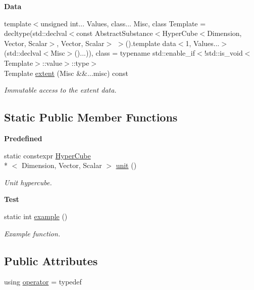 \begin{Indent}{\bf Data}
\begin{DoxyCompactItemize}
{\footnotesize template$<$unsigned int... Values, class... Misc, class Template  = decltype(std\-::declval$<$const Abstract\-Substance$<$\-Hyper\-Cube$<$\-Dimension, Vector, Scalar$>$, Vector, Scalar$>$ $>$().\-template data$<$1, Values...$>$(std\-::declval$<$\-Misc$>$()...)), class  = typename std\-::enable\-\_\-if$<$!std\-::is\-\_\-void$<$\-Template$>$\-::value$>$\-::type$>$ }\\Template \hyperlink{exceptionmagrathea_1_1HyperCube_a4212f1eaaa72536c7bf9e1ac85e10359}{extent} (Misc \&\&...misc) const 
\begin{DoxyCompactList}\small\item\em Immutable access to the extent data. \end{DoxyCompactList}\end{DoxyCompactItemize}
\end{Indent}
\subsection*{Static Public Member Functions}
\begin{Indent}{\bf Predefined}\par
\begin{DoxyCompactItemize}
\item 
static constexpr \hyperlink{exceptionmagrathea_1_1HyperCube}{Hyper\-Cube}\\*
$<$ Dimension, Vector, Scalar $>$ \hyperlink{exceptionmagrathea_1_1HyperCube_acba25838ca056f463417afc488342aa8}{unit} ()
\begin{DoxyCompactList}\small\item\em Unit hypercube. \end{DoxyCompactList}\end{DoxyCompactItemize}
\end{Indent}
\begin{Indent}{\bf Test}\par
\begin{DoxyCompactItemize}
\item 
static int \hyperlink{exceptionmagrathea_1_1HyperCube_aad39405bf632664757308e7b0465c398}{example} ()
\begin{DoxyCompactList}\small\item\em Example function. \end{DoxyCompactList}\end{DoxyCompactItemize}
\end{Indent}
\subsection*{Public Attributes}
\begin{DoxyCompactItemize}
\item 
using \hyperlink{exceptionmagrathea_1_1HyperCube_aef38eae81fcb467a2019ddd215c14b1e}{operator} = typedef
\end{DoxyCompactItemize}
